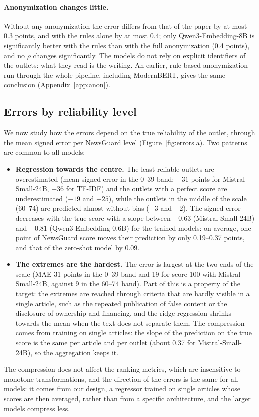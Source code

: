 \documentclass[11pt,a4paper]{article}
\begin{document}
\paragraph{Anonymization changes little.}
Without any anonymization the error differs from that of the paper by at most 0.3 points, and with the rules alone by
at most 0.4; only Qwen3-Embedding-8B is significantly better with the rules than with the full anonymization (0.4
points), and no $\rho$ changes significantly. The models do not rely on explicit identifiers of the outlets: what they
read is the writing. An earlier, rule-based anonymization run through the whole pipeline, including ModernBERT, gives
the same conclusion (Appendix~\ref{app:anon}).

\subsection{Errors by reliability level}\label{sec:errors}
We now study how the errors depend on the true reliability of the outlet, through the mean signed error per NewsGuard
level (Figure~\ref{fig:errors}a). Two patterns are common to all models:
\begin{itemize}
  \item \textbf{Regression towards the centre.} The least reliable outlets are overestimated (mean signed error in the
        0--39 band: $+31$ points for Mistral-Small-24B, $+36$ for TF-IDF) and the outlets with a perfect score are
        underestimated ($-19$ and $-25$), while the outlets in the middle of the scale (60--74) are predicted almost
        without bias ($-3$ and $-2$). The signed error decreases with the true score with a slope between $-0.63$
        (Mistral-Small-24B) and $-0.81$ (Qwen3-Embedding-0.6B) for the trained models: on average, one point of
        NewsGuard score moves their prediction by only 0.19--0.37 points, and that of the zero-shot model by 0.09.
  \item \textbf{The extremes are the hardest.} The error is largest at the two ends of the scale (MAE 31 points in the
        0--39 band and 19 for score 100 with Mistral-Small-24B, against 9 in the 60--74 band). Part of this is a
        property of the target: the extremes are reached through criteria that are hardly visible in a single article,
        such as the repeated publication of false content or the disclosure of ownership and financing, and the ridge
        regression shrinks towards the mean when the text does not separate them. The compression comes from training on single articles: the slope of the prediction on the true score is the same per
        article and per outlet (about 0.37 for Mistral-Small-24B), so the aggregation keeps it.
\end{itemize}
The compression does not affect the ranking metrics, which are insensitive to monotone transformations, and the
direction of the errors is the same for all models: it comes from our design, a regressor trained on single articles whose scores are then averaged, rather than from a
specific architecture, and the larger models compress less.
\end{document}
